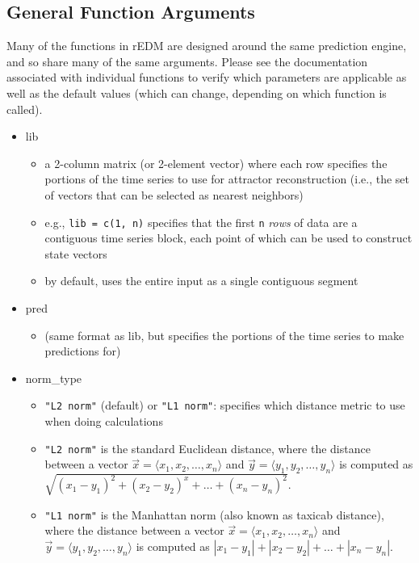 \subsection{General Function Arguments}

Many of the functions in rEDM are designed around the same prediction engine, and so share many of the same arguments. Please see the documentation associated with individual functions to verify which parameters are applicable as well as the default values (which can change, depending on which function is called).

\begin{itemize}
\item lib
	\begin{itemize}
    	\item a 2-column matrix (or 2-element vector) where each row specifies the portions of the time series to use for attractor reconstruction (i.e., the set of vectors that can be selected as nearest neighbors)
	\item e.g., \lstinline{lib = c(1, n)} specifies that the first \lstinline{n} \emph{rows} of data are a contiguous time series block, each point of which can be used to construct state vectors
	\item by default, uses the entire input as a single contiguous segment
	\end{itemize}
\item pred
	\begin{itemize}
	\item (same format as lib, but specifies the portions of the time series to make predictions for)
	\end{itemize}
\item norm\_type
	\begin{itemize}
	\item \lstinline{"L2 norm"} (default) or \lstinline{"L1 norm"}: specifies which distance metric to use when doing calculations
	\item \lstinline{"L2 norm"} is the standard Euclidean distance, where the distance between a vector $\vec{x} = \langle x_1, x_2, \dots, x_n \rangle$ and $\vec{y} = \langle y_1, y_2, \dots, y_n \rangle$ is computed as $\sqrt{(x_1 - y_1)^2 + (x_2 - y_2)^x + \dots + (x_n - y_n)^2}$.
	\item \lstinline{"L1 norm"} is the Manhattan norm (also known as taxicab distance), where the distance between a vector $\vec{x} = \langle x_1, x_2, \dots, x_n \rangle$ and $\vec{y} = \langle y_1, y_2, \dots, y_n \rangle$ is computed as $|x_1 - y_1| + |x_2 - y_2| + \dots + |x_n - y_n|$.

\end{itemize}
\end{itemize}
